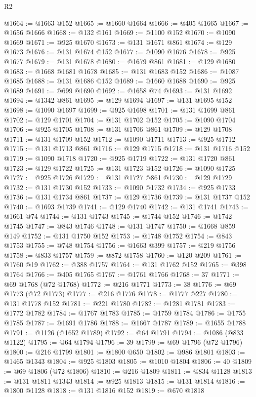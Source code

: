\begin{lexlean}{R2}
\begin{coremodule}
@1664 := @1663 @152
@1665 := @1660 @1664
@1666 := @405 @1665
@1667 := @1656 @1666
@1668 := @132 @161
@1669 := @1100 @152
@1670 := @1090 @1669
@1671 := @925 @1670
@1673 := @131 @1671 @861
@1674 := @129 @1673
@1676 := @131 @1674 @152
@1677 := @1090 @1676
@1678 := @925 @1677
@1679 := @131 @1678
@1680 := @1679 @861
@1681 := @129 @1680
@1683 := @1668 @1681 @1678
@1685 := @131 @1683 @152
@1686 := @1087 @1685
@1688 := @131 @1686 @152
@1689 := @1660 @1688
@1690 := @925 @1689
@1691 := @699 @1690
@1692 := @1658 @74
@1693 := @131 @1692
@1694 := @1342 @861
@1695 := @129 @1694
@1697 := @131 @1695 @152
@1698 := @1090 @1697
@1699 := @925 @1698
@1701 := @131 @1699 @861
@1702 := @129 @1701
@1704 := @131 @1702 @152
@1705 := @1090 @1704
@1706 := @925 @1705
@1708 := @131 @1706 @861
@1709 := @129 @1708
@1711 := @131 @1709 @152
@1712 := @1090 @1711
@1713 := @925 @1712
@1715 := @131 @1713 @861
@1716 := @129 @1715
@1718 := @131 @1716 @152
@1719 := @1090 @1718
@1720 := @925 @1719
@1722 := @131 @1720 @861
@1723 := @129 @1722
@1725 := @131 @1723 @152
@1726 := @1090 @1725
@1727 := @925 @1726
@1729 := @131 @1727 @861
@1730 := @129 @1729
@1732 := @131 @1730 @152
@1733 := @1090 @1732
@1734 := @925 @1733
@1736 := @131 @1734 @861
@1737 := @129 @1736
@1739 := @131 @1737 @152
@1740 := @1693 @1739
@1741 := @129 @1740
@1742 := @131 @1741
@1743 := @1661 @74
@1744 := @131 @1743
@1745 := @1744 @152
@1746 := @1742 @1745
@1747 := @843 @1746
@1748 := @131 @1747
@1750 := @1668 @859 @149
@1752 := @131 @1750 @152
@1753 := @1748 @1752
@1754 := @843 @1753
@1755 := @748 @1754
@1756 := @1663 @399
@1757 := @219 @1756
@1758 := @833 @1757
@1759 := @872 @1758
@1760 := @120 @209
@1761 := @1760 @19
@1762 := @388 @1757
@1764 := @131 @1762 @152
@1765 := @398 @1764
@1766 := @405 @1765
@1767 := @1761 @1766
@1768 := 37
@1771 := @69 @1768 (@72 @1768)
@1772 := @216 @1771
@1773 := 38
@1776 := @69 @1773 (@72 @1773)
@1777 := @216 @1776
@1778 := @1777 @227
@1780 := @131 @1778 @152
@1781 := @221 @1780
@1782 := @1281 @1781
@1783 := @1772 @1782
@1784 := @1767 @1783
@1785 := @1759 @1784
@1786 := @1755 @1785
@1787 := @1691 @1786
@1788 := @1667 @1787
@1789 := @1655 @1788
@1791 := @1126 (@1652 @1789)
@1792 := @64 @1791
@1794 := @1086 (@833 @1122)
@1795 := @64 @1794
@1796 := 39
@1799 := @69 @1796 (@72 @1796)
@1800 := @216 @1799
@1801 := @1800 @650
@1802 := @986 @1801
@1803 := @1465 @1343
@1804 := @925 @1803
@1805 := @1010 @1804
@1806 := 40
@1809 := @69 @1806 (@72 @1806)
@1810 := @216 @1809
@1811 := @834 @1128
@1813 := @131 @1811 @1343
@1814 := @925 @1813
@1815 := @131 @1814
@1816 := @1800 @1128
@1818 := @131 @1816 @152
@1819 := @670 @1818

\end{coremodule}
\end{lexlean}
